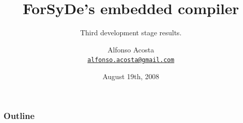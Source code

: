 \documentclass{beamer}
\title%
{ForSyDe's embedded compiler}
\subtitle{Third development stage results.}
\author[A.Acosta] %
{Alfonso Acosta\\
\footnotesize \href{mailto:alfonso.acosta@gmail.com}{\nolinkurl{alfonso.acosta@gmail.com}}}
\institute[KTH] %
{ICT/ECS\\Royal Institute of Technology, Stockholm}
\date%
{August 19th, 2008}
\begin{document}
\begin{frame}
  \titlepage
\end{frame}

\begin{frame}
  \frametitle{Outline}
  \tableofcontents[pausesections]
\end{frame}





\beamerdefaultoverlayspecification{}
\end{document}
